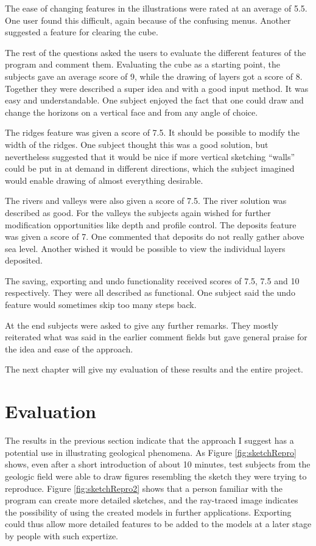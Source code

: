 \documentclass[a4paper,12pt]{report}
\begin{document}
The ease of changing features in the illustrations were rated at an average of 5.5. One user found this difficult, again because of the confusing menus. Another suggested a feature for clearing the cube.

The rest of the questions asked the users to evaluate the different features of the program and comment them. Evaluating the cube as a starting point, the subjects gave an average score of 9, while the drawing of layers got a score of 8. Together they were described a super idea and with a good input method. It was easy and understandable. One subject enjoyed the fact that one could draw and change the horizons on a vertical face and from any angle of choice.

The ridges feature was given a score of 7.5. It should be possible to modify the width of the ridges. One subject thought this was a good solution, but nevertheless suggested that it would be nice if more vertical sketching ``walls'' could be put in at demand in different directions, which the subject imagined would enable drawing of almost everything desirable.

The rivers and valleys were also given a score of 7.5. The river solution was described as good. For the valleys the subjects again wished for further modification opportunities like depth and profile control. The deposits feature was given a score of 7. One commented that deposits do not really gather above sea level. Another wished it would be possible to view the individual layers deposited.

The saving, exporting and undo functionality received scores of 7.5, 7.5 and 10 respectively. They were all described as functional. One subject said the undo feature would sometimes skip too many steps back.

At the end subjects were asked to give any further remarks. They mostly reiterated what was said in the earlier comment fields but gave general praise for the idea and ease of the approach.

The next chapter will give my evaluation of these results and the entire project.

\clearpage
\chapter{Evaluation}
\label{sec:eval}
The results in the previous section indicate that the approach I suggest has a potential use in illustrating geological phenomena. As Figure \ref{fig:sketchRepro} shows, even after a short introduction of about 10 minutes, test subjects from the geologic field were able to draw figures resembling the sketch they were trying to reproduce. Figure \ref{fig:sketchRepro2} shows that a person familiar with the program can create more detailed sketches, and the ray-traced image indicates the possibility of using the created models in further applications. Exporting could thus allow more detailed features to be added to the models at a later stage by people with such expertize.
\end{document}
